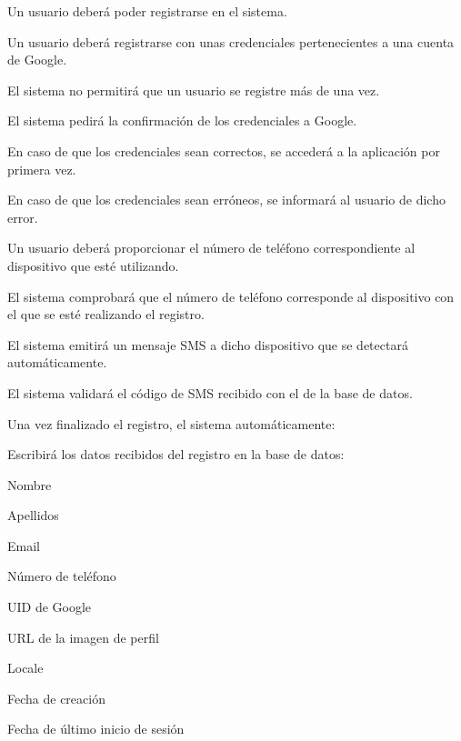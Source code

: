 \begin{myEnumerate}
  \item Un usuario deberá poder registrarse en el sistema.\label{req_registro} %
  \begin{myEnumerate}
    
    \item Un usuario deberá registrarse con unas credenciales pertenecientes a una cuenta de Google.
    \begin{myEnumerate}
      \item El sistema no permitirá que un usuario se registre más de una vez.
      \item El sistema pedirá la confirmación de los credenciales a Google.
      \begin{myEnumerate}
      	\item En caso de que los credenciales sean correctos, se accederá a la aplicación por primera vez.
      	\item En caso de que los credenciales sean erróneos, se informará al usuario de dicho error.
       \end{myEnumerate}
    \end{myEnumerate}
    
    \item Un usuario deberá proporcionar el número de teléfono correspondiente al dispositivo que esté utilizando.
    \begin{myEnumerate}
    	\item El sistema comprobará que el número de teléfono corresponde al dispositivo con el que se esté realizando el registro.
    	\begin{myEnumerate}
     		\item El sistema emitirá un mensaje SMS a dicho dispositivo que se detectará automáticamente.
      		\item El sistema validará el código de SMS recibido con el de la base de datos.
    	\end{myEnumerate}
   	\end{myEnumerate} 
   	
   	\item Una vez finalizado el registro, el sistema automáticamente:
   		\begin{myEnumerate}
   		\item Escribirá los datos recibidos del registro en la base de datos:
    		\begin{myEnumerate}
      			\item Nombre
      			\item Apellidos
      			\item Email
      			\item Número de teléfono
      			\item UID de Google
      			\item URL de la imagen de perfil
      			\item Locale
      			\item Fecha de creación
      			\item Fecha de último inicio de sesión
    		\end{myEnumerate}
    		

\end{myEnumerate}
\end{myEnumerate}
\end{myEnumerate}
